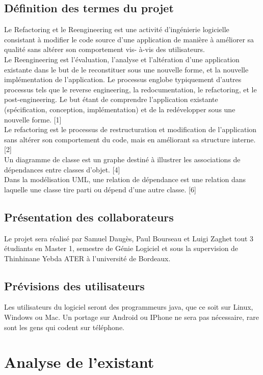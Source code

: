 \documentclass{article}
\begin{document}
\subsection{Définition des termes du projet}
Le Refactoring et le Reengineering est une activité d’ingénierie logicielle consistant à modifier le
code source d’une application de manière à améliorer sa qualité sans altérer son comportement vis-
à-vis des utilisateurs.\\
Le Reengineering est l’évaluation, l’analyse et l’altération d’une application existante dans le
but de le reconstituer sous une nouvelle forme, et la nouvelle implémentation de
l’application. Le processus englobe typiquement d’autres processus tels que le reverse
engineering, la redocumentation, le refactoring, et le post-engineering. Le but étant de
comprendre l’application existante (spécification, conception, implémentation) et de la
redévelopper sous une nouvelle forme. [1]\\
Le refactoring est le processus de restructuration et modification de l’application sans altérer
son comportement du code, mais en améliorant sa structure interne. [2]\\
Un diagramme de classe est un graphe destiné à illustrer les associations de dépendances entre classes d'objet. [4]\\
Dans la modélisation UML, une relation de dépendance est une relation dans laquelle une classe tire parti ou dépend d'une autre classe. [6]
\subsection{Présentation des collaborateurs}
Le projet sera réalisé par Samuel Daugès, Paul Bourseau et  Luigi Zaghet tout 3 étudiants en Master 1, semestre de Génie Logiciel et sous la supervision de Thinhinane Yebda ATER à l'université de Bordeaux.
\subsection{Prévisions des utilisateurs}
Les utilisateurs du logiciel seront des programmeurs java, que ce soit sur Linux, Windows ou Mac. Un portage sur Android ou IPhone ne sera pas nécessaire, rare sont les gens qui codent sur téléphone.
\section{Analyse de l'existant}
\end{document}
